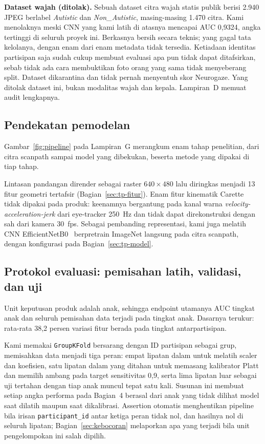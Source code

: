 \documentclass{article}
\begin{document}
\textbf{Dataset wajah (ditolak).} Sebuah dataset citra wajah statis publik berisi 2.940 JPEG
berlabel \emph{Autistic} dan \emph{Non\_Autistic}, masing-masing 1.470 citra. Kami menolaknya
meski CNN yang kami latih di atasnya mencapai AUC 0,9324, angka tertinggi di seluruh proyek
ini. Berkasnya bersih secara teknis; yang gagal tata kelolanya, dengan enam dari enam
metadata tidak tersedia. Ketiadaan identitas partisipan saja sudah cukup membuat evaluasi
apa pun tidak dapat ditafsirkan, sebab tidak ada cara membuktikan foto orang yang sama tidak
menyeberang split. Dataset dikarantina dan tidak pernah menyentuh skor Neurogaze. Yang
ditolak dataset ini, bukan modalitas wajah dan kepala. Lampiran~D memuat audit lengkapnya.

\subsection{Pendekatan pemodelan}

Gambar~\ref{fig:pipeline} pada Lampiran~G merangkum enam tahap penelitian, dari citra
scanpath sampai model yang dibekukan, beserta metode yang dipakai di tiap tahap.

Lintasan pandangan dirender sebagai raster $640 \times 480$ lalu diringkas menjadi 13 fitur
geometri tertafsir (Bagian~\ref{sec:tp-fitur}). Enam fitur kinematik Carette tidak dipakai
pada produk: keenamnya bergantung pada kanal warna \emph{velocity-acceleration-jerk} dari
eye-tracker 250~Hz dan tidak dapat direkonstruksi dengan sah dari kamera 30~fps. Sebagai
pembanding representasi, kami juga melatih CNN EfficientNetB0~\cite{tan2019} berpretrain
ImageNet langsung pada citra scanpath, dengan konfigurasi pada Bagian~\ref{sec:tp-model}.

\subsection{Protokol evaluasi: pemisahan latih, validasi, dan uji}
\label{sec:split}

Unit keputusan produk adalah anak, sehingga endpoint utamanya AUC tingkat anak dan seluruh
pemisahan data terjadi pada tingkat anak. Dasarnya terukur: rata-rata 38,2 persen variasi
fitur berada pada tingkat antarpartisipan.

Kami memakai \texttt{GroupKFold} bersarang dengan ID partisipan sebagai grup, memisahkan data
menjadi tiga peran: empat lipatan dalam untuk melatih scaler dan koefisien, satu lipatan
dalam yang ditahan untuk memasang kalibrator Platt dan memilih ambang pada target
sensitivitas 0,9, serta lima lipatan luar sebagai uji tertahan dengan tiap anak muncul tepat
satu kali. Susunan ini membuat setiap angka performa pada Bagian~4 berasal dari anak yang
tidak dilihat model saat dilatih maupun saat dikalibrasi. Assertion otomatis menghentikan
pipeline bila irisan \texttt{participant\_id} antar ketiga peran tidak nol, dan hasilnya nol
di seluruh lipatan; Bagian~\ref{sec:kebocoran} melaporkan apa yang terjadi bila unit
pengelompokan ini salah dipilih.
\end{document}

